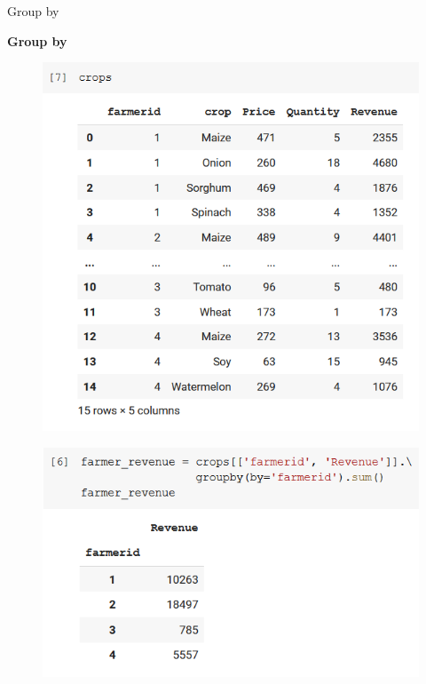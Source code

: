 \documentclass[aspectratio=169]{beamer}
\begin{document}
\begin{frame}{Group by}

	\textbf{Group by}

	\begin{multicols}{2}

		\begin{figure}
			\centering
			\includegraphics[width=\linewidth]{img/crops_with_revenue.png}
		\end{figure}

		\begin{figure}
			\centering
			\includegraphics[width=\linewidth]{img/groupby.png}
		\end{figure}

	\end{multicols}

\end{frame}
\end{document}
